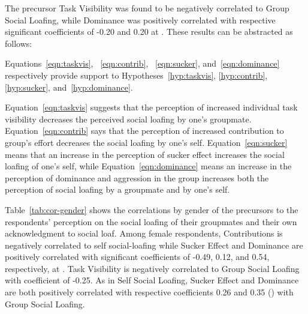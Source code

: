 \documentclass[a4paper,a4paper,BCOR12mm,12pt,abstracton,pointednumbers,tablecaptionabove,footinclude,halfparskip,normalheadings,]{scrartcl}
\begin{document}
The precursor Task Visibility was found to be negatively correlated to Group Social Loafing, while Dominance was positively correlated with respective significant coefficients of -0.20 and 0.20 at . These results can be abstracted as follows:


Equations~\ref{eqn:taskvis}, ~\ref{eqn:contrib}, ~\ref{eqn:sucker}, and~\ref{eqn:dominance} respectively provide support to Hypotheses~\ref{hyp:taskvis}, \ref{hyp:contrib}, \ref{hyp:sucker}, and~\ref{hyp:dominance}.

Equation~\ref{eqn:taskvis} suggests that the perception of increased individual task visibility decreases the perceived social loafing by one's groupmate. Equation~\ref{eqn:contrib} says that the perception of increased contribution to group's effort decreases the social loafing by one's self. Equation~\ref{eqn:sucker} means that an increase in the perception of sucker effect increases the social loafing of one's self, while Equation~\ref{eqn:dominance} means an increase in the perception of dominance and aggression in the group increases both the perception of social loafing by a groupmate and by one's self.

Table~\ref{tab:cor-gender} shows the correlations by gender of the precursors to the respondents' perception on the social loafing of their groupmates and their own acknowledgment to social loaf. Among female respondents, Contributions is negatively correlated to self social-loafing while Sucker Effect and Dominance are positively correlated with significant coefficients of -0.49, 0.12, and 0.54, respectively, at . Task Visibility is negatively correlated to Group Social Loafing with coefficient of -0.25. As in Self Social Loafing, Sucker Effect and Dominance are both positively correlated with respective coefficients 0.26 and 0.35 () with Group Social Loafing.
\end{document}
